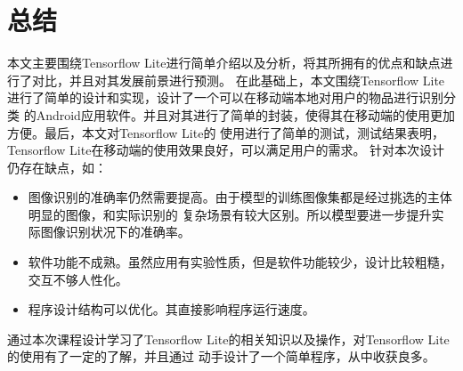 \section{总结}
本文主要围绕Tensorflow Lite进行简单介绍以及分析，将其所拥有的优点和缺点进行了对比，并且对其发展前景进行预测。
在此基础上，本文围绕Tensorflow Lite进行了简单的设计和实现，设计了一个可以在移动端本地对用户的物品进行识别分类
的Android应用软件。并且对其进行了简单的封装，使得其在移动端的使用更加方便。最后，本文对Tensorflow Lite的
使用进行了简单的测试，测试结果表明，Tensorflow Lite在移动端的使用效果良好，可以满足用户的需求。
\newpage
针对本次设计仍存在缺点，如：
\begin{itemize}
    \item 图像识别的准确率仍然需要提高。由于模型的训练图像集都是经过挑选的主体明显的图像，和实际识别的
    复杂场景有较大区别。所以模型要进一步提升实际图像识别状况下的准确率。
    \item 软件功能不成熟。虽然应用有实验性质，但是软件功能较少，设计比较粗糙，交互不够人性化。
    \item 程序设计结构可以优化。其直接影响程序运行速度。
\end{itemize}

通过本次课程设计学习了Tensorflow Lite的相关知识以及操作，对Tensorflow Lite的使用有了一定的了解，并且通过
动手设计了一个简单程序，从中收获良多。
